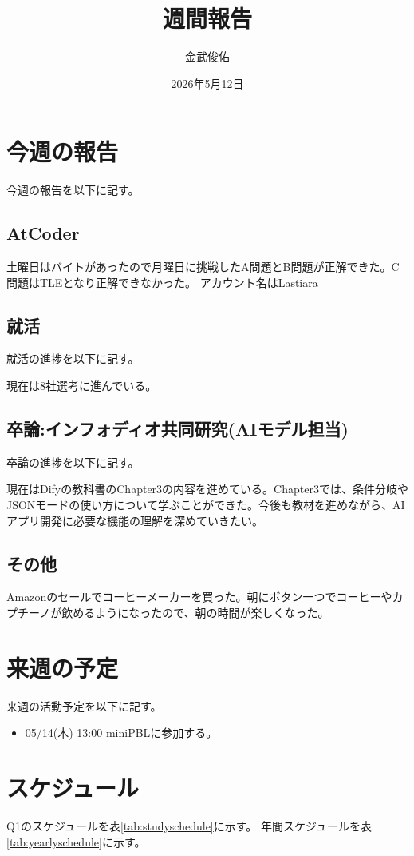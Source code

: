 \documentclass[a4paper,12pt]{ujarticle}
\title{週間報告}
\author{金武俊佑}
\date{2026年5月12日}
\begin{document}
\maketitle

\section{今週の報告}\label{sec:thisweek}
今週の報告を以下に記す。
\subsection{AtCoder}\label{sec:atcoder}
土曜日はバイトがあったので月曜日に挑戦したA問題とB問題が正解できた。C問題はTLEとなり正解できなかった。
アカウント名はLastiara
\subsection{就活}\label{sec:job}
就活の進捗を以下に記す。


現在は8社選考に進んでいる。
\subsection{卒論:インフォディオ共同研究(AIモデル担当)}\label{sec:thesis}
卒論の進捗を以下に記す。


現在はDifyの教科書のChapter3の内容を進めている。Chapter3では、条件分岐やJSONモードの使い方について学ぶことができた。今後も教材を進めながら、AIアプリ開発に必要な機能の理解を深めていきたい。


\subsection{その他}\label{sec:other}
Amazonのセールでコーヒーメーカーを買った。朝にボタン一つでコーヒーやカプチーノが飲めるようになったので、朝の時間が楽しくなった。
\section{来週の予定}\label{sec:nextweek}
来週の活動予定を以下に記す。
\begin{itemize}
  \item 05/14(木) 13:00 miniPBLに参加する。
\end{itemize}


\section{スケジュール}\label{sec:schedule}
Q1のスケジュールを表\ref{tab:studyschedule}に示す。
年間スケジュールを表\ref{tab:yearlyschedule}に示す。
\end{document}
